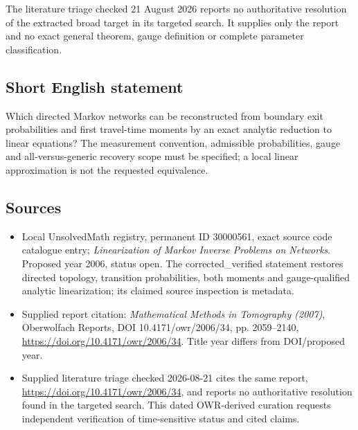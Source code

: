 \documentclass[11pt]{article}
\begin{document}
The literature triage checked 21 August 2026 reports no authoritative resolution of the extracted broad target in its targeted search. It supplies only the report and no exact general theorem, gauge definition or complete parameter classification.
\subsection{Short English statement}
Which directed Markov networks can be reconstructed from boundary exit probabilities and first travel-time moments by an exact analytic reduction to linear equations? The measurement convention, admissible probabilities, gauge and all-versus-generic recovery scope must be specified; a local linear approximation is not the requested equivalence.
\subsection{Sources}
\begin{itemize}
\item Local UnsolvedMath registry, permanent ID 30000561, exact source code catalogue entry; \emph{Linearization of Markov Inverse Problems on Networks}. Proposed year 2006, status open. The corrected\_verified statement restores directed topology, transition probabilities, both moments and gauge-qualified analytic linearization; its claimed source inspection is metadata.
\item Supplied report citation: \emph{Mathematical Methods in Tomography (2007)}, Oberwolfach Reports, DOI 10.4171/owr/2006/34, pp. 2059--2140, \url{https://doi.org/10.4171/owr/2006/34}. Title year differs from DOI/proposed year.
\item Supplied literature triage checked 2026-08-21 cites the same report, \url{https://doi.org/10.4171/owr/2006/34}, and reports no authoritative resolution found in the targeted search. This dated OWR-derived curation requests independent verification of time-sensitive status and cited claims.
\end{itemize}
\end{document}
